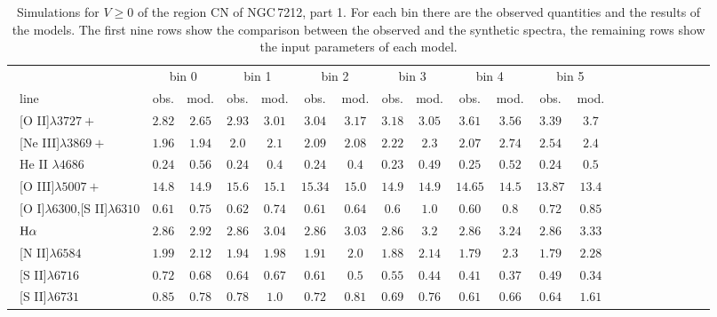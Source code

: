 \documentclass[../thesis.tex]{subfiles}
\begin{document}
\begin{landscape}
\begin{table}

\centering
\caption{Simulations for $V\ge0$ of the region CN of NGC\,7212, part 1.  For each bin there are the observed quantities and the results of the models. The first nine rows show the comparison between the observed and the synthetic spectra, the remaining rows show the input parameters of each model.}
\label{tab:sim_cn+1N}


\small{
\begin{tabular}{lcccccccccccccccccccc}
\hline
\ &\multicolumn{2}{c}{bin 0} &\multicolumn{2}{c}{bin 1}&\multicolumn{2}{c}{bin 2}&\multicolumn{2}{c}{bin 3}&\multicolumn{2}{c}{bin 4}&\multicolumn{2}{c}{bin 5}\\
\   line              &obs.  &mod.   & obs.  &mod.   &obs.&mod.    &obs.  &mod.   &obs.  &mod.    &obs.&mod.  \\ \hline
\ [O II]$\lambda3727+$          &$2.82  $&$2.65  $&$2.93   $&$ 3.01 $&$3.04 $&$3.17  $&$3.18  $&$3.05  $&$3.61  $&$3.56  $&$3.39  $&$3.7   $\\
\  [Ne III]$\lambda3869+$        &$1.96  $&$1.94  $&$2.0    $&$ 2.1  $&$2.09 $&$2.08  $&$2.22  $&$2.3   $&$2.07  $&$2.74  $&$2.54  $&$2.4   $  \\
\  He II $\lambda4686$           &$0.24  $&$0.56  $&$0.24   $&$ 0.4  $&$0.24 $&$0.4   $&$0.23  $&$0.49  $&$0.25  $&$0.52  $&$0.24  $&$0.5  $\\
\  [O III]$\lambda5007+$         &$14.8  $&$14.9  $&$ 15.6  $&$ 15.1 $&$15.34$&$15.0  $&$14.9  $&$14.9  $&$14.65 $&$14.5  $&$13.87 $&$13.4$ \\
\ [O I]$\lambda6300$,[S II]$\lambda6310$          &$0.61  $&$0.75  $&$0.62   $&$0.74  $&$0.61 $&$0.64  $&$0.6   $&$1.0   $&$0.60  $&$0.8   $&$0.72  $&$0.85$ \\
\ $\rm H\alpha$                 &$2.86  $&$2.92  $&$2.86   $&$ 3.04 $&$2.86 $&$3.03  $&$2.86  $&$3.2   $&$2.86  $&$3.24  $&$2.86  $&$3.33$ \\
\  [N II]$\lambda6584$           &$1.99  $&$2.12  $&$1.94   $&$ 1.98 $&$1.91 $&$2.0   $&$1.88  $&$2.14  $&$1.79  $&$2.3   $&$1.79  $&$2.28 $\\
\  [S II]$\lambda6716$           &$0.72  $&$0.68  $&$0.64   $&$ 0.67 $&$0.61 $&$0.5   $&$0.55  $&$0.44  $&$0.41  $&$0.37  $&$0.49  $&$0.34$ \\
\  [S II]$\lambda6731$           &$0.85  $&$0.78  $&$0.78   $&$ 1.0  $&$0.72 $&$0.81  $&$0.69  $&$0.76  $&$0.61  $&$0.66  $&$0.64  $&$1.61 $\\

\end{tabular}}
\end{table}
\end{landscape}
\end{document}
